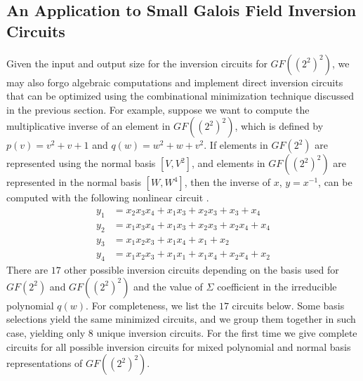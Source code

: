 \subsection{An Application to Small Galois Field Inversion Circuits}
Given the input and output size for the inversion circuits for $GF((2^2)^2)$, we may also forgo algebraic computations and implement direct inversion circuits that can be optimized using the combinational minimization technique discussed in the previous section. For example, suppose we want to compute the multiplicative inverse of an element in $GF((2^2)^2)$, which is defined by $p(v) = v^2 + v + 1$ and $q(w) = w^2 + w + v^2$. If elements in $GF(2^2)$ are represented using the normal basis $[V, V^2]$, and elements in $GF((2^2)^2)$ are represented in the normal basis $[W, W^4]$, then the inverse of $x$, $y = x^{-1}$, can be computed with the following nonlinear circuit \cite{Boyar12-1}.
\begin{align*}
y_1 & = x_2x_3x_4 + x_1x_3 + x_2x_3 + x_3 + x_4 \\
y_2 & = x_1x_3x_4 + x_1x_3 + x_2x_3 + x_2x_4 + x_4 \\
y_3 & = x_1x_2x_3 + x_1x_4 + x_1 + x_2 \\
y_4 & = x_1x_2x_3 + x_1x_1 + x_1x_4 + x_2x_4 + x_2
\end{align*}
There are $17$ other possible inversion circuits depending on the basis used for $GF(2^2)$ and $GF((2^2)^2)$ and the value of $\Sigma$ coefficient in the irreducible polynomial $q(w)$. For completeness, we list the $17$ circuits below. Some basis selections yield the same minimized circuits, and we group them together in such case, yielding only $8$ unique inversion circuits. For the first time we give complete circuits for all possible inversion circuits for mixed polynomial and normal basis representations of $GF((2^2)^2)$. 

